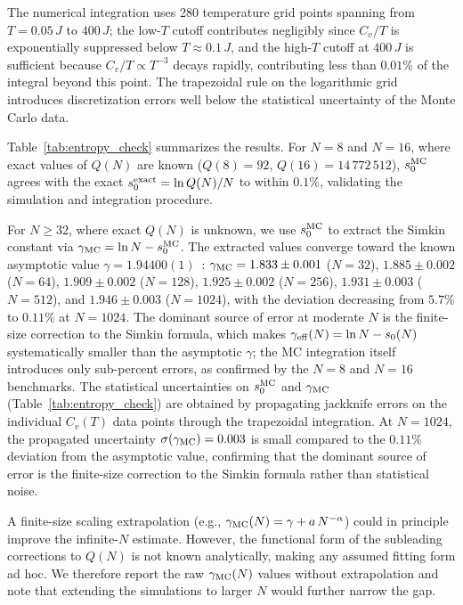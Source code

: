 \documentclass[aps, pre, reprint, amsmath, amssymb, superscriptaddress, floatfix]{revtex4-2}
\begin{document}
The numerical integration uses 280 temperature grid points
spanning from $T = 0.05\,J$ to $400\,J$; the low-$T$
cutoff contributes negligibly since $C_v/T$ is exponentially
suppressed below $T \approx 0.1\,J$, and the high-$T$ cutoff at
$400\,J$ is sufficient because $C_v/T \propto T^{-3}$ decays
rapidly, contributing less than $0.01\%$ of the integral beyond
this point.  The trapezoidal rule on the logarithmic grid introduces
discretization errors well below the statistical uncertainty of the
Monte Carlo data.

Table~\ref{tab:entropy_check} summarizes the results.
For $N = 8$ and $N = 16$, where exact values of $Q(N)$ are known
($Q(8) = 92$, $Q(16) = 14\,772\,512$), $s_0^{\rm MC}$ agrees with
the exact $s_0^{\rm exact} = \ln Q(N)/N$ to within $0.1\%$,
validating the simulation and integration procedure.

For $N \ge 32$, where exact $Q(N)$ is unknown, we use $s_0^{\rm MC}$
to extract the Simkin constant via
$\gamma_{\rm MC} = \ln N - s_0^{\rm MC}$.
The extracted values converge toward the known
asymptotic value $\gamma = 1.94400(1)$~\cite{Nobel2023}:
$\gamma_{\rm MC} = 1.833 \pm 0.001$ ($N = 32$), $1.885 \pm 0.002$ ($N = 64$),
$1.909 \pm 0.002$ ($N = 128$), $1.925 \pm 0.002$ ($N = 256$),
$1.931 \pm 0.003$ ($N = 512$), and $1.946 \pm 0.003$ ($N = 1024$), with the deviation
decreasing from $5.7\%$ to $0.11\%$ at $N = 1024$.
The dominant source of error at moderate $N$ is the finite-size
correction to the Simkin formula, which makes $\gamma_{\rm eff}(N)
= \ln N - s_0(N)$ systematically smaller than the asymptotic
$\gamma$; the MC integration itself introduces only sub-percent
errors, as confirmed by the $N = 8$ and $N = 16$ benchmarks.
The statistical uncertainties on $s_0^{\rm MC}$ and $\gamma_{\rm MC}$
(Table~\ref{tab:entropy_check}) are obtained by propagating jackknife
errors on the individual $C_v(T)$ data points through the trapezoidal
integration.  At $N = 1024$, the propagated uncertainty
$\sigma(\gamma_{\rm MC}) = 0.003$ is small compared to the $0.11\%$
deviation from the asymptotic value, confirming that the dominant
source of error is the finite-size correction to the Simkin formula
rather than statistical noise.

A finite-size scaling extrapolation
(e.g., $\gamma_{\rm MC}(N) = \gamma + a\,N^{-\alpha}$) could in
principle improve the infinite-$N$ estimate.  However, the functional
form of the subleading corrections to $Q(N)$ is not known
analytically, making any assumed fitting form ad hoc.  We therefore
report the raw $\gamma_{\rm MC}(N)$ values without extrapolation
and note that extending the simulations to larger $N$ would
further narrow the gap.
\end{document}
